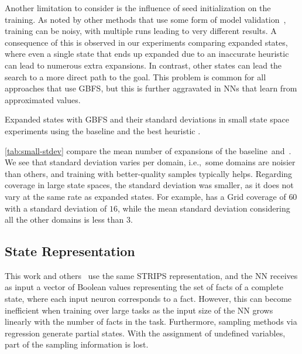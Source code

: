 Another limitation to consider is the influence of seed initialization on the training. As noted by other methods that use some form of model validation~\cite{ferber2020neural, shen2020learning, ferber2022neural, otoole2022sampling}, training can be noisy, with multiple runs leading to very different results. A consequence of this is observed in our experiments comparing expanded states, where even a single state that ends up expanded due to an inaccurate heuristic can lead to numerous extra expansions. In contrast, other states can lead the search to a more direct path to the goal. This problem is common for all approaches that use GBFS, but this is further aggravated in NNs that learn from approximated values.

\begin{table}[tb]
    \caption[Expanded states with standard deviations in small state space experiments.]{Expanded states with GBFS and their standard deviations in small state space experiments using the baseline \hnnbase and the best heuristic \hnnrs.}
    \label{tab:small-stdev}
    \addmargin
    \centering
    
\end{table}

\cref{tab:small-stdev} compare the mean number of expansions of the baseline~\hnnbase and~\hnnrs. We see that standard deviation varies per domain, i.e.,~some domains are noisier than others, and training with better-quality samples typically helps. Regarding coverage in large state spaces, the standard deviation was smaller, as it does not vary at the same rate as expanded states. For example, \hnnrs has a Grid coverage of $60$ with a standard deviation of $16$, while the mean standard deviation considering all the other domains is less than $3$.

\subsection{State Representation}
\label{sec:limitation-representation}

This work and others~\cite{ferber2020neural, ferber2022neural, otoole2022sampling} use the same STRIPS representation, and the NN receives as input a vector of Boolean values representing the set of facts of a complete state, where each input neuron corresponds to a fact. However, this can become inefficient when training over large tasks as the input size of the NN grows linearly with the number of facts in the task. Furthermore, sampling methods via regression generate partial states. With the assignment of undefined variables, part of the sampling information is lost.


